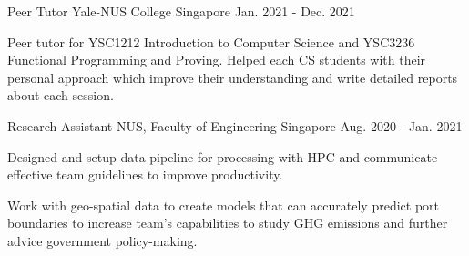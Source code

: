 \begin{cventries}
  \cventry
    {Peer Tutor} %
    {Yale-NUS College} %
    {Singapore} %
    {Jan. 2021 - Dec. 2021} %
    {
      \begin{cvitems} %
        \item {Peer tutor for YSC1212 Introduction to Computer Science and YSC3236 Functional Programming and Proving.  Helped each CS students with their personal approach which improve their understanding and write detailed reports about each session.}
      \end{cvitems}
    }
    
  \cventry
    {Research Assistant} %
    {NUS, Faculty of Engineering} %
    {Singapore} %
    {Aug. 2020 - Jan. 2021} %
    {
      \begin{cvitems} %
        \item {Designed and setup data pipeline for processing with HPC and communicate effective team guidelines to improve productivity.}
        \item {Work with geo-spatial data to create models that can accurately predict port boundaries to increase team’s capabilities to study GHG emissions and further advice government policy-making.}
      \end{cvitems}
    }
    
    

\end{cventries}
